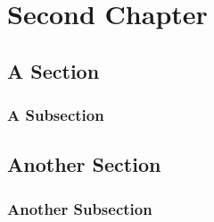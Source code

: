 \chapter{Second Chapter}
\section{A Section}
\subsection{A Subsection}
\section{Another Section}
\subsection{Another Subsection}
